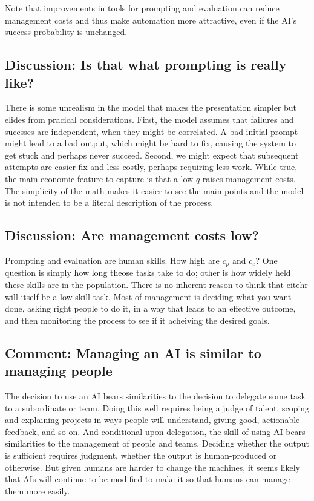 \documentclass{article}
\begin{document}
Note that improvements in tools for prompting and evaluation can reduce management costs and thus make automation more attractive, even if the AI's success probability is unchanged.

\begin{tcolorbox}
\subsection{Discussion: Is that what prompting is really like?}
There is some unrealism in the model that makes the presentation simpler but elides from pracical considerations.
First, the model assumes that failures and sucesses are independent, when they might be correlated.
A bad initial prompt might lead to a bad output, which might be hard to fix, causing the system to get stuck and perhaps never succeed. 
Second, we might expect that subsequent attempts are easier fix and less costly, perhaps requiring less work. 
While true, the main economic feature to capture is that a low $q$ raises management costs.
The simplicity of the math makes it easier to see the main points and the model is not intended to be a literal description of the process.
\end{tcolorbox}

\begin{tcolorbox}
\subsection{Discussion: Are management costs low?}
Prompting and evaluation are human skills.
How high are $c_p$ and $c_e$?
One question is simply how long theose tasks take to do; other is how widely held these skills are in the population.
There is no inherent reason to think that eitehr will itself be a low-skill task.
Most of management is deciding what you want done, asking right people to do it, in a way that leads to an effective outcome, and then monitoring the process to see if it acheiving the desired goals.
\end{tcolorbox}

\begin{tcolorbox}
\subsection{Comment: Managing an AI is similar to managing people}
The decision to use an AI bears similarities to the decision to delegate some task to a subordinate or team.
Doing this well requires being a judge of talent, scoping and explaining projects in ways people will understand, giving good, actionable feedback, and so on. 
And conditional upon delegation, the skill of using AI bears similarities to the management of people and teams. 
Deciding whether the output is sufficient requires judgment, whether the output is human-produced or otherwise. 
But given humans are harder to change the machines, it seems likely that AIs will continue to be modified to make it so that humans can manage them more easily. 
\end{tcolorbox}
\end{document}
